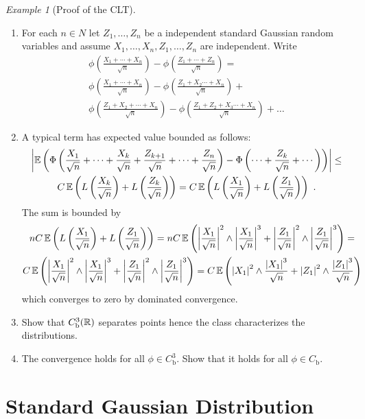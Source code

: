 \documentclass[12pt,a4paper]{amsart}
\theoremstyle{plain}%
\theoremstyle{definition}
\theoremstyle{remark}
\newtheorem{example}{Example}
\begin{document}
\begin{example}[Proof of the CLT]
\begin{enumerate}
\item For each $n \in N$ let $Z_1,\dots,Z_n$ be a independent standard Gaussian random variables and assume $X_1,\dots,X_n,Z_1,\dots,Z_n$ are independent. Write
    \begin{multline*}
      \phi\left(\frac{X_1+\cdots+X_n}{\sqrt n}\right) - \phi\left(\frac{Z_1+\cdots+Z_n}{\sqrt n}\right) = \\
      \phi\left(\frac{X_1+\cdots+X_n}{\sqrt n}\right) - \phi\left(\frac{Z_1+X_2\cdots+X_n}{\sqrt n}\right) + \\
      \phi\left(\frac{Z_1+X_2+\cdots+X_n}{\sqrt n}\right) - \phi\left(\frac{Z_1+Z_2+X_3\cdots+X_n}{\sqrt n}\right) + \dots
    \end{multline*}
\item A typical term has expected value bounded as follows:
  \begin{multline*}
\left\vert\operatorname{\mathbb E}\left(\Phi\left(\frac{X_1}{\sqrt n}+ \cdots + \frac{X_k}{\sqrt n} + \frac{Z_{k+1}}{\sqrt n}+ \cdots +\frac{Z_n}{\sqrt n}\right) - \Phi\left(\cdots + \frac{Z_k}{\sqrt n} + \cdots\right)\right)\right\vert \leq \\ C \operatorname{\mathbb E}\left(L\left(\frac{X_k}{\sqrt n}\right) + L\left(\frac{Z_k}{\sqrt n}\right)\right) = C \operatorname{\mathbb E}\left(L\left(\frac{X_1}{\sqrt n}\right) + L\left(\frac{Z_1}{\sqrt n}\right)\right) \ .    
  \end{multline*}
The sum is bounded by
\begin{multline*}
nC \operatorname{\mathbb E}\left(L\left(\frac{X_1}{\sqrt n}\right) + L\left(\frac{Z_1}{\sqrt n}\right)\right) = nC \operatorname{\mathbb E}\left(\left\vert\frac{X_1}{\sqrt n}\right\vert^2\wedge \left\vert\frac{X_1}{\sqrt n}\right\vert^3 + \left\vert\frac{Z_1}{\sqrt n}\right\vert^2\wedge \left\vert\frac{Z_1}{\sqrt n}\right\vert^3\right) = \\
C \operatorname{\mathbb E}\left(\left\vert\frac{X_1}{\sqrt n}\right\vert^2\wedge \left\vert\frac{X_1}{\sqrt n}\right\vert^3 + \left\vert\frac{Z_1}{\sqrt n}\right\vert^2\wedge \left\vert\frac{Z_1}{\sqrt n}\right\vert^3\right) =
C \operatorname{\mathbb E}\left(\left\vert X_1\right\vert^2 \wedge \frac{\left\vert X_1\right\vert^3}{\sqrt n} + \left\vert Z_1\right\vert^2 \wedge \frac{\left\vert Z_1\right\vert^3}{\sqrt n}\right)\end{multline*}
which converges to zero by dominated convergence.
\item Show that $C^3_{\text b}(\mathbb{R})$ separates points hence the class
  characterizes the distributions.
  \item The convergence holds for all $\phi \in C^3_{\text{b}}$. Show that it holds for all $\phi \in C_{\text{b}}$.
  \end{enumerate}  
\end{example}

\section{Standard Gaussian Distribution}
\label{sec:recap}
   
\end{document}

